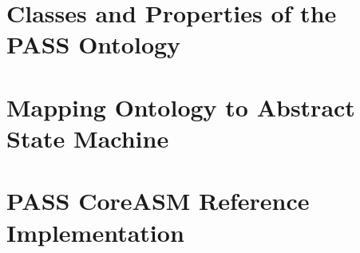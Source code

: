 \appendix

\chapter[Classes and Properties of the PASS Ontology]{Classes and Properties of the\\PASS Ontology}



\chapter{Mapping Ontology to Abstract State Machine}



\chapter{PASS CoreASM Reference Implementation}
\label{CoreASM-Reference-Implementation}


